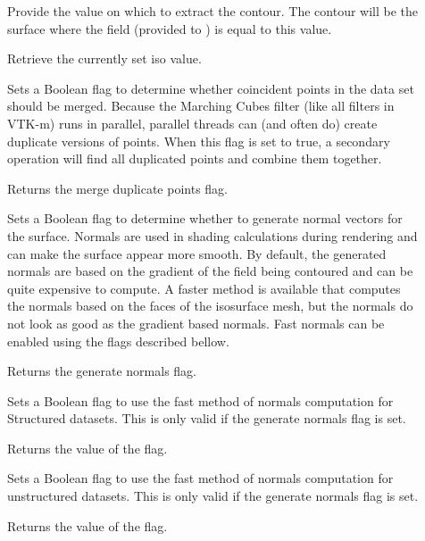 \begin{description}
\item[] Provide the value on which to extract the
  contour. The contour will be the surface where the field (provided to
  ) is equal to this value.
\item[] Retrieve the currently set iso value.
\item[] Sets a Boolean flag to determine
  whether coincident points in the data set should be merged. Because the
  Marching Cubes filter (like all filters in VTK-m) runs in parallel,
  parallel threads can (and often do) create duplicate versions of points.
  When this flag is set to true, a secondary operation will find all
  duplicated points and combine them together.
\item[] Returns the merge duplicate
  points flag.
\item[] Sets a Boolean flag to determine
  whether to generate normal vectors for the surface. Normals are used in
  shading calculations during rendering and can make the surface appear
  more smooth. By default, the generated normals are based on the gradient
  of the field being contoured and can be quite expensive to compute. A faster
  method is available that computes the normals based on the faces of the
  isosurface mesh, but the normals do not look as good as the gradient based
  normals. Fast normals can be enabled using the flags described bellow.
\item[] Returns the generate normals flag.
\item[] Sets a Boolean flag to
  use the fast method of normals computation for Structured datasets. This
  is only valid if the generate normals flag is set.
\item[] Returns the value of
  the  flag.
\item[] Sets a Boolean flag to
  use the fast method of normals computation for unstructured datasets. This
  is only valid if the generate normals flag is set.
\item[] Returns the value of
  the  flag.
\end{description}


